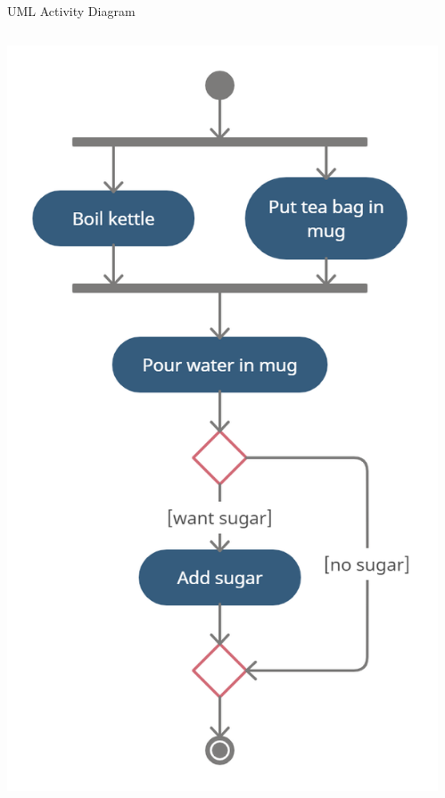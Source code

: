 \begin{frame}{UML Activity Diagram}
	\begin{columns}
		\begin{column}{0.4\textwidth}
			\includegraphics[width=\textwidth]{activity_diagram}
		\end{column}
		\begin{column}{0.58\textwidth}
		\end{column}
	\end{columns}
\end{frame}

